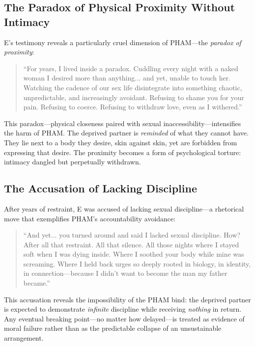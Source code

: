 \documentclass[12pt,openany]{book}
\numberwithin{equation}{chapter}
\begin{document}
\subsection{The Paradox of Physical Proximity Without Intimacy}

E's testimony reveals a particularly cruel dimension of PHAM---the \textit{paradox of proximity}:

\begin{quote}
``For years, I lived inside a paradox. Cuddling every night with a naked woman I desired more than anything... and yet, unable to touch her. Watching the cadence of our sex life disintegrate into something chaotic, unpredictable, and increasingly avoidant. Refusing to shame you for your pain. Refusing to coerce. Refusing to withdraw love, even as I withered.''
\end{quote}

This paradox---physical closeness paired with sexual inaccessibility---intensifies the harm of PHAM. The deprived partner is \textit{reminded} of what they cannot have. They lie next to a body they desire, skin against skin, yet are forbidden from expressing that desire. The proximity becomes a form of psychological torture: intimacy dangled but perpetually withdrawn.

\subsection{The Accusation of Lacking Discipline}

After years of restraint, E was accused of lacking sexual discipline---a rhetorical move that exemplifies PHAM's accountability avoidance:

\begin{quote}
``And yet... you turned around and said I lacked sexual discipline. How? After all that restraint. All that silence. All those nights where I stayed soft when I was dying inside. Where I soothed your body while mine was screaming. Where I held back urges so deeply rooted in biology, in identity, in connection---because I didn't want to become the man my father became.''
\end{quote}

This accusation reveals the impossibility of the PHAM bind: the deprived partner is expected to demonstrate \textit{infinite} discipline while receiving \textit{nothing} in return. Any eventual breaking point---no matter how delayed---is treated as evidence of moral failure rather than as the predictable collapse of an unsustainable arrangement.
\end{document}
